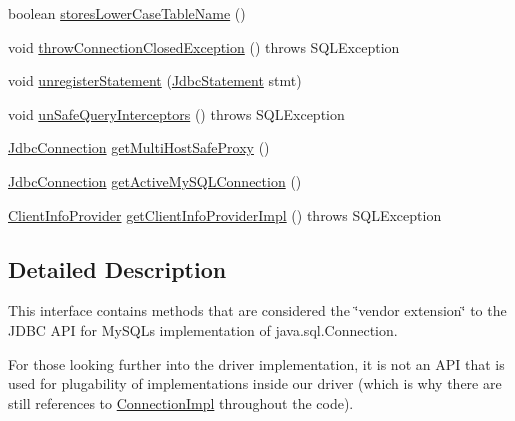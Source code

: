 \begin{DoxyCompactItemize}
\item 
boolean \mbox{\hyperlink{interfacecom_1_1mysql_1_1cj_1_1jdbc_1_1_jdbc_connection_a6a1919361434e33f3de8410b87dab6e1}{stores\+Lower\+Case\+Table\+Name}} ()
\item 
void \mbox{\hyperlink{interfacecom_1_1mysql_1_1cj_1_1jdbc_1_1_jdbc_connection_a8554721dac5197512681010d325b5e87}{throw\+Connection\+Closed\+Exception}} ()  throws S\+Q\+L\+Exception
\item 
void \mbox{\hyperlink{interfacecom_1_1mysql_1_1cj_1_1jdbc_1_1_jdbc_connection_aea0e19ebe576a318c72df2d72cc25c94}{unregister\+Statement}} (\mbox{\hyperlink{interfacecom_1_1mysql_1_1cj_1_1jdbc_1_1_jdbc_statement}{Jdbc\+Statement}} stmt)
\item 
void \mbox{\hyperlink{interfacecom_1_1mysql_1_1cj_1_1jdbc_1_1_jdbc_connection_a5ffe05b61a153efd3a321b3b4a9a1c7a}{un\+Safe\+Query\+Interceptors}} ()  throws S\+Q\+L\+Exception
\item 
\mbox{\hyperlink{interfacecom_1_1mysql_1_1cj_1_1jdbc_1_1_jdbc_connection}{Jdbc\+Connection}} \mbox{\hyperlink{interfacecom_1_1mysql_1_1cj_1_1jdbc_1_1_jdbc_connection_af10e050fd33e42f9daddf69224c5179e}{get\+Multi\+Host\+Safe\+Proxy}} ()
\item 
\mbox{\hyperlink{interfacecom_1_1mysql_1_1cj_1_1jdbc_1_1_jdbc_connection}{Jdbc\+Connection}} \mbox{\hyperlink{interfacecom_1_1mysql_1_1cj_1_1jdbc_1_1_jdbc_connection_aa5b980c79d1c7d58535c5c469e3d4f24}{get\+Active\+My\+S\+Q\+L\+Connection}} ()
\item 
\mbox{\hyperlink{interfacecom_1_1mysql_1_1cj_1_1jdbc_1_1_client_info_provider}{Client\+Info\+Provider}} \mbox{\hyperlink{interfacecom_1_1mysql_1_1cj_1_1jdbc_1_1_jdbc_connection_ab3325dceec74bde20215836ade6845ad}{get\+Client\+Info\+Provider\+Impl}} ()  throws S\+Q\+L\+Exception
\end{DoxyCompactItemize}


\subsection{Detailed Description}
This interface contains methods that are considered the \char`\"{}vendor extension\char`\"{} to the J\+D\+BC A\+PI for My\+S\+QL\textquotesingle{}s implementation of java.\+sql.\+Connection.

For those looking further into the driver implementation, it is not an A\+PI that is used for plugability of implementations inside our driver (which is why there are still references to \mbox{\hyperlink{classcom_1_1mysql_1_1cj_1_1jdbc_1_1_connection_impl}{Connection\+Impl}} throughout the code). 


